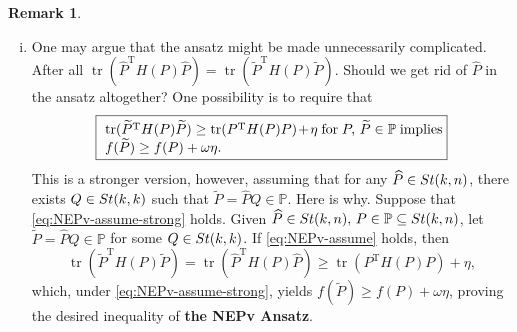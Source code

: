 \documentclass[11pt]{article}
\def\bbP{\mathbb{P}}
\def\wtd{\widetilde}
\def\what{\widehat}
\newcommand\STM[2]{{\rm St}(#1,#2)}
\DeclareMathOperator{\diag}{diag}
\DeclareMathOperator{\tr}{tr}
\DeclareMathOperator{\T}{T}
\theoremstyle{definition}
\newtheorem{remark}{Remark}[section]
\numberwithin{equation}{section}
\begin{document}
\begin{remark}
\begin{enumerate}[(i)]
  \item One may argue that the ansatz %
        might be made unnecessarily complicated. After all
        $\tr(\what P^{\T}H(P)\what P)=\tr(\wtd P^{\T}H(P)\wtd P)$. Should  we get rid of $\what P$ in the ansatz altogether?
        One possibility is to require that
        \begin{equation}\label{eq:NEPv-assume-strong}
        \framebox{
        \parbox{8.5cm}{
        $\tr(\wtd P^{\T}H(P)\wtd P)\ge\tr(P^{\T}H(P)P)+\eta$ for $P,\,\wtd P\in\bbP$
        implies $f(\wtd P)\ge f(P)+\omega\eta$.
        }}
        \end{equation}
        This is a stronger version, however,
        assuming
        that for any $\what P\in\STM{k}{n}$, there exists $Q\in\STM{k}{k}$ such that $\wtd P=\what PQ\in\bbP$.
        Here is why.
        Suppose that \eqref{eq:NEPv-assume-strong} holds. Given $\what P\in\STM{k}{n},\,P\in\bbP\subseteq\STM{k}{n}$,
        let $\wtd P=\what PQ\in\bbP$ for some $Q\in\STM{k}{k}$. If \eqref{eq:NEPv-assume} holds, then
        $$
        \tr(\wtd P^{\T}H(P)\wtd P)=\tr(\what P^{\T}H(P)\what P)\ge\tr(P^{\T}H(P)P)+\eta,
        $$
        which, under \eqref{eq:NEPv-assume-strong}, yields $f(\wtd P)\ge f(P)+\omega\eta$, proving the desired inequality
        of {\bf the NEPv Ansatz}.

\end{enumerate}
\end{remark}
\end{document}
